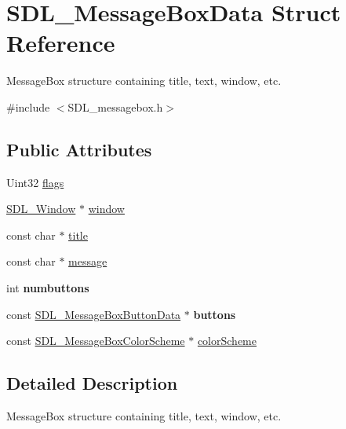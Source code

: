 \hypertarget{struct_s_d_l___message_box_data}{}\section{S\+D\+L\+\_\+\+Message\+Box\+Data Struct Reference}
\label{struct_s_d_l___message_box_data}


Message\+Box structure containing title, text, window, etc.  




{\ttfamily \#include $<$S\+D\+L\+\_\+messagebox.\+h$>$}

\subsection*{Public Attributes}
\begin{DoxyCompactItemize}
\item 
Uint32 \mbox{\hyperlink{struct_s_d_l___message_box_data_a113d016f760bf4e4156b0f376358d6a0}{flags}}
\item 
\mbox{\hyperlink{_s_d_l__video_8h_a55a196c7d3b8497538632c79ae1e6392}{S\+D\+L\+\_\+\+Window}} $\ast$ \mbox{\hyperlink{struct_s_d_l___message_box_data_a5c333bc93705c66068e140bc28daedcb}{window}}
\item 
const char $\ast$ \mbox{\hyperlink{struct_s_d_l___message_box_data_a93ceeafeed20b553ad4c86c9be37f117}{title}}
\item 
const char $\ast$ \mbox{\hyperlink{struct_s_d_l___message_box_data_ada6ae208a1f85adabbd7a7a08ca609c8}{message}}
\item 
\mbox{\label{struct_s_d_l___message_box_data_a133f4fef549cc0cb14b799af35f3dc5a}} 
int {\bfseries numbuttons}
\item 
\mbox{\label{struct_s_d_l___message_box_data_a265e47aab749e384661ae91d3e11e0db}} 
const \mbox{\hyperlink{struct_s_d_l___message_box_button_data}{S\+D\+L\+\_\+\+Message\+Box\+Button\+Data}} $\ast$ {\bfseries buttons}
\item 
const \mbox{\hyperlink{struct_s_d_l___message_box_color_scheme}{S\+D\+L\+\_\+\+Message\+Box\+Color\+Scheme}} $\ast$ \mbox{\hyperlink{struct_s_d_l___message_box_data_a18744865a3e89e260db5f01aee579e35}{color\+Scheme}}
\end{DoxyCompactItemize}


\subsection{Detailed Description}
Message\+Box structure containing title, text, window, etc. 

